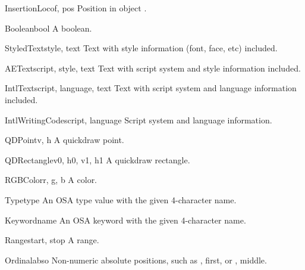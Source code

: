 \begin{classdesc}{InsertionLoc}{of, pos}
Position  in object .
\end{classdesc}

\begin{classdesc}{Boolean}{bool}
A boolean.
\end{classdesc}

\begin{classdesc}{StyledText}{style, text}
Text with style information (font, face, etc) included.
\end{classdesc}

\begin{classdesc}{AEText}{script, style, text}
Text with script system and style information included.
\end{classdesc}

\begin{classdesc}{IntlText}{script, language, text}
Text with script system and language information included.
\end{classdesc}

\begin{classdesc}{IntlWritingCode}{script, language}
Script system and language information.
\end{classdesc}

\begin{classdesc}{QDPoint}{v, h}
A quickdraw point.
\end{classdesc}

\begin{classdesc}{QDRectangle}{v0, h0, v1, h1}
A quickdraw rectangle.
\end{classdesc}

\begin{classdesc}{RGBColor}{r, g, b}
A color.
\end{classdesc}

\begin{classdesc}{Type}{type}
An OSA type value with the given 4-character name.
\end{classdesc}

\begin{classdesc}{Keyword}{name}
An OSA keyword with the given 4-character name.
\end{classdesc}

\begin{classdesc}{Range}{start, stop}
A range.
\end{classdesc}

\begin{classdesc}{Ordinal}{abso}
Non-numeric absolute positions, such as , first, or ,
middle.
\end{classdesc}

